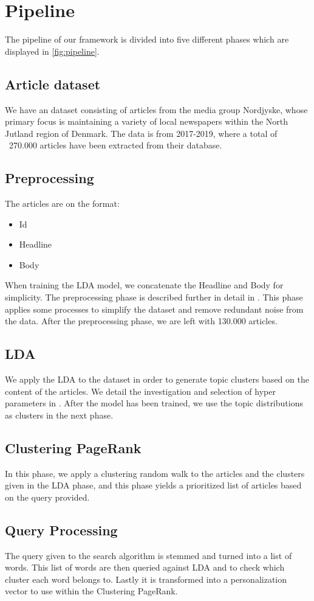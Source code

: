 \section{Pipeline}


The pipeline of our framework is divided into five different phases which are displayed in \autoref{fig:pipeline}.

\subsection{Article dataset}
We have an dataset consisting of articles from the media group Nordjyske, whose primary focus is maintaining a variety of local newspapers within the North Jutland region of Denmark. 
The data is from 2017-2019, where a total of ~270.000 articles have been extracted from their database.

\subsection{Preprocessing}
The articles are on the format:
\begin{itemize}
	\item Id
	\item Headline
	\item Body
\end{itemize}
When training the LDA model, we concatenate the Headline and Body for simplicity.
The preprocessing phase is described further in detail in .
This phase applies some processes to simplify the dataset and remove redundant noise from the data. 
After the preprocessing phase, we are left with 130.000 articles.

\subsection{LDA}
We apply the \acrfull{LDA} to the dataset in order to generate topic clusters based on the content of the articles. 
We detail the investigation and selection of hyper parameters in . 
After the model has been trained, we use the topic distributions as clusters in the next phase.

\subsection{Clustering PageRank}
In this phase, we apply a clustering random walk to the articles and the clusters given in the \gls{LDA} phase, and this phase yields a prioritized list of articles based on the query provided.


\subsection{Query Processing}
The query given to the search algorithm is stemmed and turned into a list of words. 
This list of words are then queried against LDA and to check which cluster each word belongs to.
Lastly it is transformed into a personalization vector to use within the Clustering PageRank.


